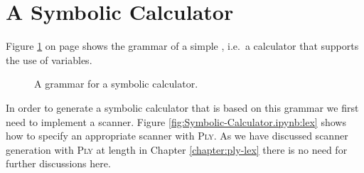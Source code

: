 \section{A Symbolic Calculator}
Figure \ref{fig:calculator.g} on page \pageref{fig:calculator.g} shows the grammar of a simple 
, i.e.~a calculator that supports the use of variables.  

\begin{figure}[!ht]

  \begin{center}    
  \end{center}
  \caption{A grammar for a symbolic calculator.}
  \label{fig:calculator.g}
\end{figure}

In order to generate a symbolic calculator that is based on this grammar we first need to implement a scanner.
Figure \ref{fig:Symbolic-Calculator.ipynb:lex} shows how to specify an appropriate scanner with \textsc{Ply}.
As we have discussed scanner generation with \textsc{Ply} at length in Chapter \ref{chapter:ply-lex} there is
no need for further discussions here.

